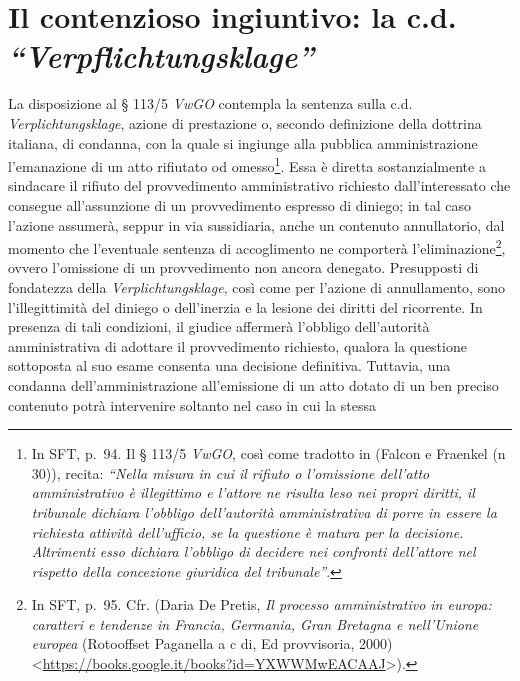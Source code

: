 \documentclass[12pt,it,a4paper,]{report}
\begin{document}
\hypertarget{il-contenzioso-ingiuntivo-la-c.d.-verpflichtungsklage}{%
\section{\texorpdfstring{Il contenzioso ingiuntivo: la c.d.
\emph{``Verpflichtungsklage''}}{Il contenzioso ingiuntivo: la c.d. ``Verpflichtungsklage''}}\label{il-contenzioso-ingiuntivo-la-c.d.-verpflichtungsklage}}

La disposizione al § 113/5 \emph{VwGO} contempla la sentenza sulla c.d.
\emph{Verplichtungsklage}, azione di prestazione o, secondo definizione
della dottrina italiana, di condanna, con la quale si ingiunge alla
pubblica amministrazione l'emanazione di un atto rifiutato od
omesso\footnote{In SFT, p.~94. Il § 113/5 \emph{VwGO}, così come
  tradotto in (Falcon e Fraenkel (n 30)), recita: \emph{``Nella misura
  in cui il rifiuto o l'omissione dell'atto amministrativo è illegittimo
  e l'attore ne risulta leso nei propri diritti, il tribunale dichiara
  l'obbligo dell'autorità amministrativa di porre in essere la richiesta
  attività dell'ufficio, se la questione è matura per la decisione.
  Altrimenti esso dichiara l'obbligo di decidere nei confronti
  dell'attore nel rispetto della concezione giuridica del tribunale''}.}.
Essa è diretta sostanzialmente a sindacare il rifiuto del provvedimento
amministrativo richiesto dall'interessato che consegue all'assunzione di
un provvedimento espresso di diniego; in tal caso l'azione assumerà,
seppur in via sussidiaria, anche un contenuto annullatorio, dal momento
che l'eventuale sentenza di accoglimento ne comporterà
l'eliminazione\footnote{In SFT, p.~95. Cfr. (Daria De Pretis, \emph{Il
  processo amministrativo in europa: caratteri e tendenze in Francia,
  Germania, Gran Bretagna e nell'Unione europea} (Rotooffset Paganella a
  c di, Ed provvisoria, 2000)
  \textless{}\url{https://books.google.it/books?id=YXWWMwEACAAJ}\textgreater{}).},
ovvero l'omissione di un provvedimento non ancora denegato. Presupposti
di fondatezza della \emph{Verplichtungsklage}, così come per l'azione di
annullamento, sono l'illegittimità del diniego o dell'inerzia e la
lesione dei diritti del ricorrente. In presenza di tali condizioni, il
giudice affermerà l'obbligo dell'autorità amministrativa di adottare il
provvedimento richiesto, qualora la questione sottoposta al suo esame
consenta una decisione definitiva. Tuttavia, una condanna
dell'amministrazione all'emissione di un atto dotato di un ben preciso
contenuto potrà intervenire soltanto nel caso in cui la stessa
\end{document}

